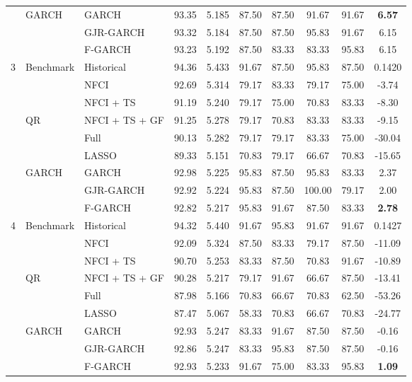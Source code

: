 \begin{tabular}{llp{10em}ccccccc}
& \multirow{3}{*}{{GARCH}} &    GARCH & 93.35 & 5.185 & 87.50 & 87.50 & 91.67 & 91.67 & \textbf{6.57} \\ 
& &   GJR-GARCH & 93.32 & 5.184 & 87.50 & 87.50 & 95.83 & 91.67 & 6.15 \\ 
& &   F-GARCH & 93.23 & 5.192 & 87.50 & 83.33 & 83.33 & 95.83 & 6.15 \\  \toprule
\multirow{9}{*}{{3}} &
                      \multirow{1}{*}{{Benchmark}} & Historical & 94.36 & 5.433 & 91.67 & 87.50 & 95.83 & 87.50 & 0.1420 \\  \cmidrule(lr){2-3}\cmidrule(lr){4-5} \cmidrule(lr){6-9} \cmidrule(lr){10-10}
& &   NFCI & 92.69 & 5.314 & 79.17 & 83.33 & 79.17 & 75.00 & -3.74 \\ 
& &   NFCI + TS & 91.19 & 5.240 & 79.17 & 75.00 & 70.83 & 83.33 & -8.30 \\ 
& \multirow{1}{*}{{QR}} &    NFCI + TS + GF  & 91.25 & 5.278 & 79.17 & 70.83 & 83.33 & 83.33 & -9.15 \\ 
& &   Full & 90.13 & 5.282 & 79.17 & 79.17 & 83.33 & 75.00 & -30.04 \\ 
& &   LASSO & 89.33 & 5.151 & 70.83 & 79.17 & 66.67 & 70.83 & -15.65 \\  \cmidrule(lr){2-3}\cmidrule(lr){4-5} \cmidrule(lr){6-9} \cmidrule(lr){10-10}
& \multirow{3}{*}{{GARCH}} &    GARCH & 92.98 & 5.225 & 95.83 & 87.50 & 95.83 & 83.33 & 2.37 \\ 
& &   GJR-GARCH & 92.92 & 5.224 & 95.83 & 87.50 & 100.00 & 79.17 & 2.00 \\ 
& &   F-GARCH & 92.82 & 5.217 & 95.83 & 91.67 & 87.50 & 83.33 & \textbf{2.78} \\  \toprule
\multirow{9}{*}{{4}} &
                      \multirow{1}{*}{{Benchmark}} & Historical & 94.32 & 5.440 & 91.67 & 95.83 & 91.67 & 91.67 & 0.1427 \\  \cmidrule(lr){2-3}\cmidrule(lr){4-5} \cmidrule(lr){6-9} \cmidrule(lr){10-10}
& &   NFCI & 92.09 & 5.324 & 87.50 & 83.33 & 79.17 & 87.50 & -11.09 \\ 
& &   NFCI + TS & 90.70 & 5.253 & 83.33 & 87.50 & 70.83 & 91.67 & -10.89 \\ 
& \multirow{1}{*}{{QR}} &    NFCI + TS + GF  & 90.28 & 5.217 & 79.17 & 91.67 & 66.67 & 87.50 & -13.41 \\ 
& &   Full & 87.98 & 5.166 & 70.83 & 66.67 & 70.83 & 62.50 & -53.26 \\ 
& &   LASSO & 87.47 & 5.067 & 58.33 & 70.83 & 66.67 & 70.83 & -24.77 \\  \cmidrule(lr){2-3}\cmidrule(lr){4-5} \cmidrule(lr){6-9} \cmidrule(lr){10-10}
& \multirow{3}{*}{{GARCH}} &    GARCH & 92.93 & 5.247 & 83.33 & 91.67 & 87.50 & 87.50 & -0.16 \\ 
& &   GJR-GARCH & 92.86 & 5.247 & 83.33 & 95.83 & 87.50 & 87.50 & -0.16 \\ 
& &   F-GARCH & 92.93 & 5.233 & 91.67 & 75.00 & 83.33 & 95.83 & \textbf{1.09} \\  \toprule
\end{tabular}
